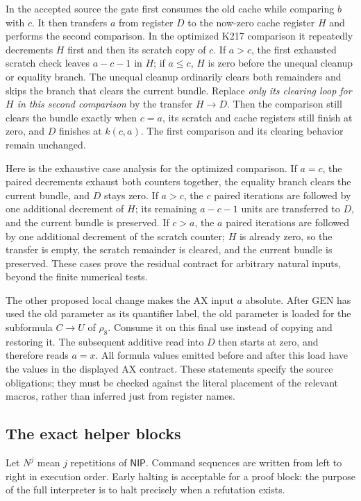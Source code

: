 In the accepted source the gate first consumes the old cache while comparing
$b$ with $c$.  It then transfers $a$ from register $D$ to the now-zero cache
register $H$ and performs the second comparison.  In the optimized K217
comparison it repeatedly decrements $H$ first and then its scratch copy of
$c$.  If $a>c$, the first exhausted scratch check leaves $a-c-1$ in $H$;
if $a\le c$, $H$ is zero before the unequal cleanup or equality branch.
The unequal cleanup ordinarily clears both remainders and skips the branch
that clears the current bundle.  Replace \emph{only its clearing loop for
$H$ in this second comparison} by the transfer $H\to D$.  Then the
comparison still clears the bundle exactly when $c=a$, its scratch and cache
registers still finish at zero, and $D$ finishes at $k(c,a)$.  The first
comparison and its clearing behavior remain unchanged.

Here is the exhaustive case analysis for the optimized comparison.  If
$a=c$, the paired decrements exhaust both counters together, the equality
branch clears the current bundle, and $D$ stays zero.  If $a>c$, the $c$
paired iterations are followed by one additional decrement of $H$; its
remaining $a-c-1$ units are transferred to $D$, and the current bundle is
preserved.  If $c>a$, the $a$ paired iterations are followed by one
additional decrement of the scratch counter; $H$ is already zero, so the
transfer is empty, the scratch remainder is cleared, and the current bundle
is preserved.  These cases prove the residual contract for arbitrary
natural inputs, beyond the finite numerical tests.

The other proposed local change makes the AX input $a$ absolute.  After GEN
has used the old parameter as its quantifier label, the old parameter is
loaded for the subformula $C\mathbin{\to}U$ of $\rho_8$.  Consume it on
this final use instead of copying and restoring it.  The subsequent additive
read into $D$ then starts at zero, and therefore reads $a=x$.  All formula
values emitted before and after this load have the values in the displayed
AX contract.  These statements specify the source obligations; they must be
checked against the literal placement of the relevant macros, rather than
inferred just from register names.

\subsection{The exact helper blocks}

Let $N^j$ mean $j$ repetitions of $\mathsf{NIP}$.  Command sequences are
written from left to right in execution order.  Early halting is acceptable
for a proof block: the purpose of the full interpreter is to halt precisely
when a refutation exists.


